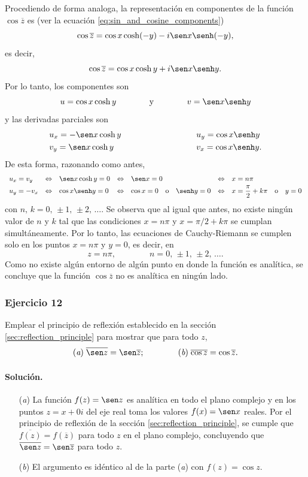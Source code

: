 \documentclass[a4paper]{report}
\begin{document}
Procediendo de forma analoga, la representación en componentes de la función \(\cos\overline{z}\) es (ver la ecuación \ref{eq:sin_and_cosine_components})
\[
 \cos\overline{z}=\cos x\cosh(-y)-i\sen x\senh(-y),
\]
es decir,
\[
 \cos\overline{z}=\cos x\cosh y+i\sen x\senh y.
\]
Por lo tanto, los componentes son 
 \[
  u=\cos x\cosh y
  \qquad\qquad\textrm{y}\qquad\qquad
  v=\sen x\senh y
 \]
 y las derivadas parciales son
 \[
 \begin{array}{ll}
  u_x=-\sen x\cosh y\qquad\qquad\qquad\qquad&u_y=\cos x\senh y\\[\smallskipamount]
  v_y=\sen x\cosh y\qquad\qquad\qquad\qquad&v_x=\cos x\senh y.
 \end{array}
 \]
 De esta forma, razonando como antes,
 \[
 \begin{array}{lllllllll}
  u_x=v_y&\Leftrightarrow&\sen x\cosh y=0&\Leftrightarrow&\sen x=0&\Leftrightarrow&x=n\pi\\[\smallskipamount]
  u_y=-v_x&\Leftrightarrow&\cos x\senh y=0&\Leftrightarrow&\cos x=0\quad\textrm{o}\quad\senh y=0&\Leftrightarrow&x=\dfrac{\pi}{2}+k\pi\quad\textrm{o}\quad y=0
 \end{array}
 \] 
 con \(n,\,k=0,\,\pm1,\,\pm2,\,\dots\). Se observa que al igual que antes, no existe ningún valor de \(n\) y \(k\) tal que las condiciones \(x=n\pi\) y \(x=\pi/2+k\pi\) se cumplan simultáneamente. Por lo tanto, las ecuaciones de Cauchy-Riemann se cumplen solo en los puntos \(x=n\pi\) y \(y=0\), es decir, en
 \[
  z=n\pi,
  \qquad\qquad
  n=0,\,\pm1,\,\pm2,\,\dots.
 \]
Como no existe algún entorno de algún punto en donde la función es analítica, se concluye que la función \(\cos\overline{z}\) no es analítica en ningún lado. 

\subsubsection{Ejercicio 12}

Emplear el principio de reflexión establecido en la sección \ref{sec:reflection_principle} para mostrar que para todo \(z\), 
\[
 (\textit{a})\;\overline{\sen z}=\sen\overline{z};\qquad\qquad (\textit{b})\;\overline{\cos z}=\cos\overline{z}.
\]

\paragraph{Solución.} 
\begin{enumerate}
 \item[(\textit{a})] La función \(f(z)=\sen z\) es analítica en todo el plano complejo y en los puntos \(z=x+0i\) del eje real toma los valores \(f(x)=\sen x\) reales. Por el principio de reflexión de la sección \ref{sec:reflection_principle}, se cumple que \(\overline{f(z)}=f(\overline{z})\) para todo \(z\) en el plano complejo, concluyendo que \(\overline{\sen z}=\sen\overline{z}\) para todo \(z\).
 \item[(\textit{b})] El argumento es idéntico al de la parte (\textit{a}) con \(f(z)=\cos z\).
\end{enumerate}
\end{document}

